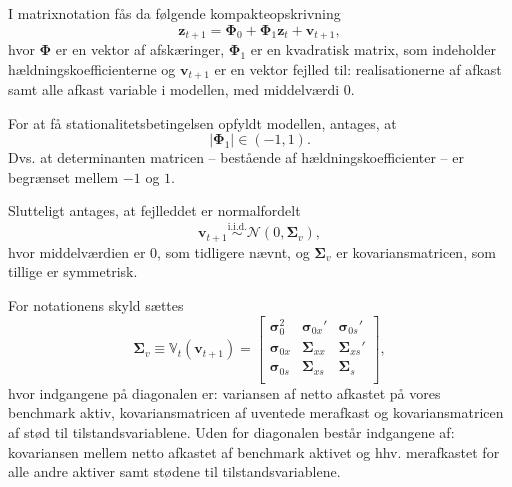 \documentclass[
  a4paper,
  oneside]{memoir}
\begin{document}
\vspace{5mm}

I matrixnotation fås da følgende kompakteopskrivning
\begin{equation}\label{eq:1}
        \bm{z}_{t+1}=\bm{\Phi}_0+\bm{\Phi}_1\bm{z}_t+\bm{v}_{t+1},
    \end{equation}
hvor \(\bm{\Phi}\) er en vektor af afskæringer, \(\bm{\Phi}_1\) er en kvadratisk matrix, som indeholder hældningskoefficienterne og \(\bm{v}_{t+1}\) er en vektor fejlled til: realisationerne af afkast samt alle afkast variable i modellen, med middelværdi \(0\).

\vspace{5mm}

For at få stationalitetsbetingelsen opfyldt modellen, antages, at
\begin{equation*}
        |\bm{\Phi}_1|\in(-1,1).
    \end{equation*}
Dvs. at determinanten matricen -- bestående af hældningskoefficienter -- er begrænset mellem \(-1\) og \(1\).

\vspace{5mm}

Slutteligt antages, at fejlleddet er normalfordelt
\begin{equation}\label{eq:2}
        \bm{v}_{t+1}\overset{\text{i.i.d.}}{\sim}\mathcal{N}(0,\bm{\Sigma}_v),
    \end{equation}
hvor middelværdien er \(0\), som tidligere nævnt, og \(\bm{\Sigma}_v\) er kovariansmatricen, som tillige er symmetrisk.

For notationens skyld sættes
\begin{equation*}
        \bm{\Sigma}_v\equiv \mathbb{V}_t(\bm{v}_{t+1})=
        \begin{bmatrix}
        \bm{\sigma}_0^2 & \bm{\sigma}_{0x}' & \bm{\sigma}_{0s}'\\
        \bm{\sigma}_{0x} & \bm{\Sigma}_{xx} & \bm{\Sigma}_{xs}'\\
        \bm{\sigma}_{0s} & \bm{\Sigma}_{xs} & \bm{\Sigma}_{s}\\
        \end{bmatrix},
    \end{equation*}
hvor indgangene på diagonalen er: variansen af netto afkastet på vores benchmark aktiv, kovariansmatricen af uventede merafkast og kovariansmatricen af stød til tilstandsvariablene. Uden for diagonalen består indgangene af: kovariansen mellem netto afkastet af benchmark aktivet og hhv. merafkastet for alle andre aktiver samt stødene til tilstandsvariablene.
\end{document}
